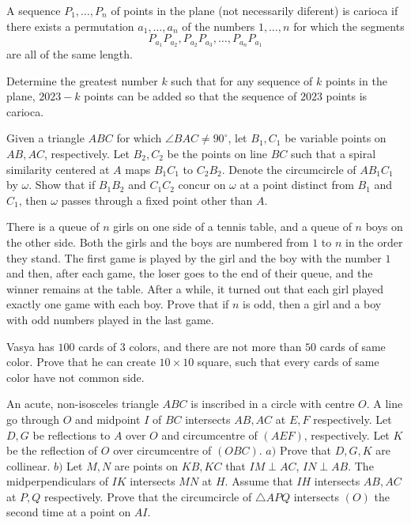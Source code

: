 \documentclass[11pt]{scrartcl}
\begin{document}
\begin{problem}[3707562559770315754]
	A sequence $P_1, \dots, P_n$ of points in the plane (not necessarily diferent) is carioca if there exists a permutation $a_1, \dots, a_n$ of the numbers $1, \dots, n$ for which the segments
$$P_{a_1}P_{a_2}, P_{a_2}P_{a_3}, \dots, P_{a_n}P_{a_1}$$are all of the same length.

Determine the greatest number $k$ such that for any sequence of $k$ points in the plane, $2023-k$ points can be added so that the sequence of $2023$ points is carioca.
\end{problem}
\begin{problem}[852531542088551]
	Given a triangle $ABC$ for which $\angle BAC \neq 90^{\circ}$, let $B_1, C_1$ be variable points on $AB,AC$, respectively. Let $B_2,C_2$ be the points on line $BC$ such that a spiral similarity centered at $A$ maps $B_1C_1$ to $C_2B_2$. Denote the circumcircle of $AB_1C_1$ by $\omega$. Show that if $B_1B_2$ and $C_1C_2$ concur on $\omega$ at a point distinct from $B_1$ and $C_1$, then $\omega$ passes through a fixed point other than $A$.
\end{problem}
\begin{problem}[259897104343709]
	There is a queue of $n{}$ girls on one side of a tennis table, and a queue of $n{}$ boys on the other side. Both the girls and the boys are numbered from $1{}$ to $n{}$ in the order they stand. The first game is played by the girl and the boy with the number $1{}$ and then, after each game, the loser goes to the end of their queue, and the winner remains at the table. After a while, it turned out that each girl played exactly one game with each boy. Prove that if $n{}$ is odd, then a girl and a boy with odd numbers played in the last game.
\end{problem}
\begin{problem}[122001240071629]
	Vasya has $100$ cards of $3$ colors, and there are not more than $50$ cards of same color. Prove that he can create $10\times 10$ square, such that every cards of same color have not common side.
\end{problem}
\begin{problem}[796349431725149]
An acute, non-isosceles triangle $ABC$ is inscribed in a circle with centre $O$. A line go through $O$ and midpoint $I$ of $BC$ intersects $AB, AC$ at $E, F$ respectively. Let $D, G$ be reflections to $A$ over $O$ and circumcentre of $(AEF)$, respectively. Let $K$ be the reflection of $O$ over circumcentre of $(OBC)$.
$a)$ Prove that $D, G, K$ are collinear.
$b)$ Let $M, N$ are points on $KB, KC$ that $IM\perp AC$, $IN\perp AB$. The midperpendiculars of $IK$ intersects $MN$ at $H$. Assume that $IH$ intersects $AB, AC$ at $P, Q$ respectively. Prove that the circumcircle of $\triangle APQ$ intersects $(O)$ the second time at a point on $AI$.
\end{problem}
\end{document}
